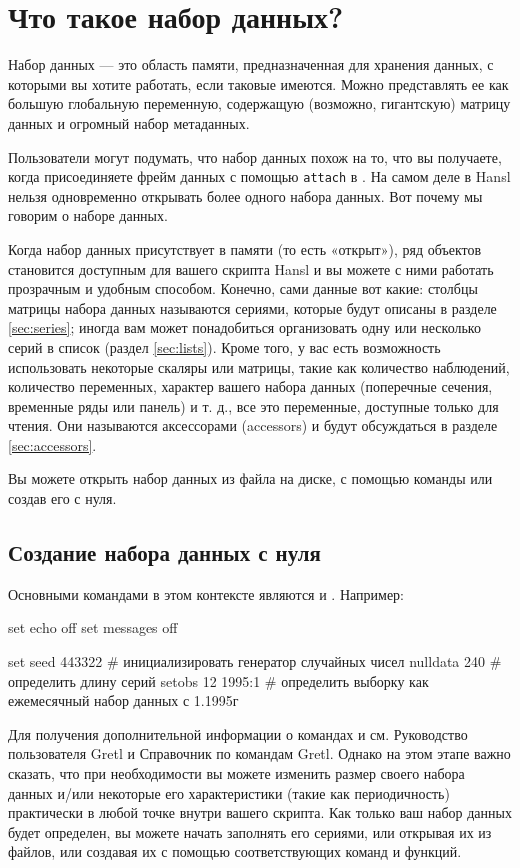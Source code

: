 \chapter{Что такое набор данных?}
\label{chap:dataset}

Набор данных --- это область памяти, предназначенная для хранения
данных, с которыми вы хотите работать, если таковые имеются. Можно
представлять ее как большую глобальную переменную, содержащую
(возможно, гигантскую) матрицу данных и огромный набор метаданных.

Пользователи  могут подумать, что набор данных похож на то, что
вы получаете, когда присоединяете фрейм данных с помощью
\texttt{attach} в . На самом деле в Hansl нельзя одновременно
открывать более одного набора данных. Вот почему мы говорим о наборе
данных.

Когда набор данных присутствует в памяти (то есть «открыт»), ряд
объектов становится доступным для вашего скрипта Hansl и вы можете с
ними работать прозрачным и удобным способом. Конечно, сами данные вот
какие: столбцы матрицы набора данных называются сериями, которые будут
описаны в разделе \ref{sec:series}; иногда вам может понадобиться
организовать одну или несколько серий в список (раздел
\ref{sec:lists}). Кроме того, у вас есть возможность использовать
некоторые скаляры или матрицы, такие как количество наблюдений,
количество переменных, характер вашего набора данных (поперечные
сечения, временные ряды или панель) и т. д., все это переменные,
доступные только для чтения. Они называются аксессорами (accessors) и
будут обсуждаться в разделе \ref{sec:accessors}.

Вы можете открыть набор данных из файла на диске, с помощью команды
 или создав его с нуля.

\section{Создание набора данных с нуля}

Основными командами в этом контексте являются  и
. Например:

\begin{code}
set echo off
set messages off

set seed 443322           # инициализировать генератор случайных чисел
nulldata 240              # определить длину серий
setobs 12 1995:1          # определить выборку как ежемесячный набор данных с 1.1995г   
\end{code}
Для получения дополнительной информации о командах  и
 см. Руководство пользователя Gretl и Справочник по
командам Gretl. Однако на этом этапе важно сказать, что при
необходимости вы можете изменить размер своего набора данных и/или
некоторые его характеристики (такие как периодичность) практически в
любой точке внутри вашего скрипта.  Как только ваш набор данных будет
определен, вы можете начать заполнять его сериями, или открывая их из
файлов, или создавая их с помощью соответствующих команд и функций.

